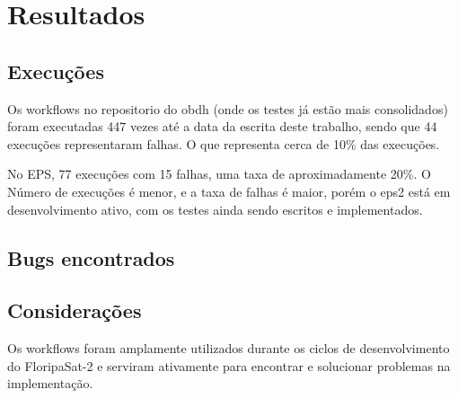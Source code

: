 \chapter{Resultados}
\label{chapter:resultados}

    \section{Execuções}
    \label{resultados:execucoes}
    Os workflows no repositorio do obdh (onde os testes já estão mais consolidados) foram executadas 447 vezes até a data da escrita deste trabalho, sendo que 44 execuções representaram falhas. O que representa cerca de 10\% das execuções.
    
    No EPS, 77 execuções com 15 falhas, uma taxa de aproximadamente 20\%. O Número de execuções é menor, e a taxa de falhas é maior, porém o eps2 está em desenvolvimento ativo, com os testes ainda sendo escritos e implementados.
    
    \section{Bugs encontrados}
    \label{resultados:bugs}
    
    \section{Considerações}
    \label{resultados:consideracoes}
    Os workflows foram amplamente utilizados durante os ciclos de desenvolvimento do FloripaSat-2 e serviram ativamente para encontrar e solucionar problemas na implementação.